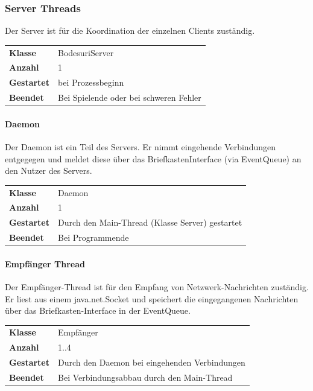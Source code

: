 \documentclass[12pt,halfparskip]{scrartcl}
\begin{document}
\subsubsection{Server Threads} %
\label{ssub:server}

Der Server ist für die Koordination der einzelnen Clients zuständig.

\begin{tabular}{@{} l p{12.5cm}}
\textbf{Klasse}       & BodesuriServer \\
\textbf{Anzahl}       & 1 \\
\textbf{Gestartet}    & bei Prozessbeginn \\
\textbf{Beendet}      & Bei Spielende oder bei schweren Fehler
\end{tabular}


\paragraph{Daemon} %
\label{ssub:daemon}

Der Daemon ist ein Teil des Servers. Er nimmt eingehende Verbindungen entgegegen und meldet diese über das BriefkastenInterface (via EventQueue) an den Nutzer des Servers.

\begin{tabular}{@{} l p{12.5cm}}
\textbf{Klasse}       & Daemon \\
\textbf{Anzahl}       & 1 \\
\textbf{Gestartet}    & Durch den Main-Thread (Klasse Server) gestartet \\
\textbf{Beendet}      & Bei Programmende
\end{tabular}


\paragraph{Empfänger Thread} %
\label{ssub:empfänger_thread}

Der Empfänger-Thread ist für den Empfang von Netzwerk-Nachrichten zuständig. Er liest aus einem java.net.Socket und speichert die eingegangenen Nachrichten über das Briefkasten-Interface in der EventQueue.

\begin{tabular}{@{} l p{12.5cm}}
\textbf{Klasse}       & Empfänger \\
\textbf{Anzahl}       & 1..4 \\
\textbf{Gestartet}    & Durch den Daemon bei eingehenden Verbindungen  \\
\textbf{Beendet}      & Bei Verbindungsabbau durch den Main-Thread
\end{tabular}
\end{document}
